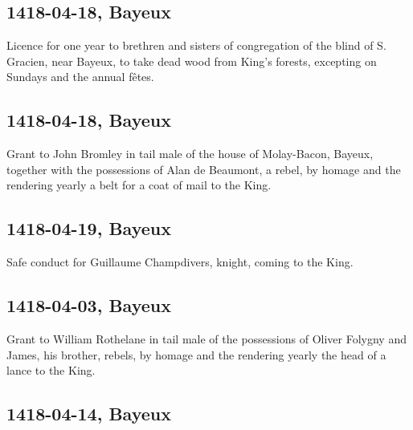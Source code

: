\documentclass[a4paper,12pt,twoside]{book}
\begin{document}
                
                \subsection{1418-04-18, Bayeux}
                
                
                     Licence for one year to brethren and sisters of congregation of the blind of S. Gracien, near Bayeux, to take dead wood from King's forests, excepting on Sundays and the annual fêtes.
                  
                
                \subsection{1418-04-18, Bayeux}
                
                
                     Grant to John Bromley in tail male of the house of Molay-Bacon, Bayeux, together with the possessions of Alan de Beaumont, a rebel, by homage and the rendering yearly a belt for a coat of mail to the King.
                  
                
                \subsection{1418-04-19, Bayeux}
                
                
                     Safe conduct for Guillaume Champdivers, knight, coming to the King.
                  
                
                \subsection{1418-04-03, Bayeux}
                
                
                     Grant to William Rothelane in tail male of the possessions of Oliver Folygny and James, his brother, rebels, by homage and the rendering yearly the head of a lance to the King.
                  
                
                \subsection{1418-04-14, Bayeux}
                
\end{document}
